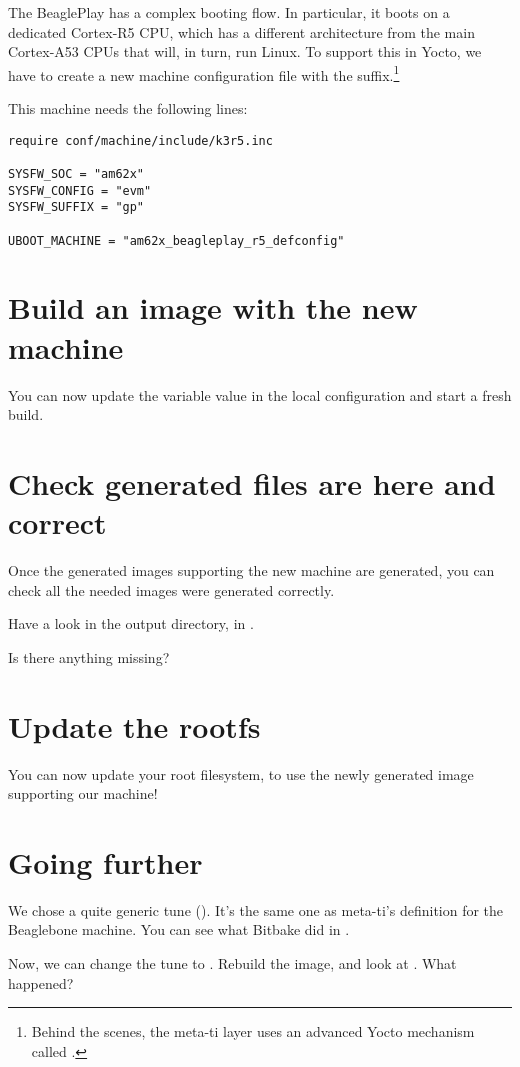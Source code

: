 The BeaglePlay has a complex booting flow. In particular, it boots on a dedicated Cortex-R5 CPU,
 which has a different architecture from the main Cortex-A53 CPUs that will, in turn, run Linux.
 To support this in Yocto, we have to create a new machine configuration file with the 
suffix.\footnote{Behind the scenes, the meta-ti layer uses an advanced Yocto mechanism called .}

This  machine needs the following lines:
\begin{verbatim}
require conf/machine/include/k3r5.inc

SYSFW_SOC = "am62x"
SYSFW_CONFIG = "evm"
SYSFW_SUFFIX = "gp"

UBOOT_MACHINE = "am62x_beagleplay_r5_defconfig"
\end{verbatim}
\fi

\section{Build an image with the new machine}

You can now update the  variable value in the local configuration
and start a fresh build.

\section{Check generated files are here and correct}

Once the generated images supporting the new  machine are
generated, you can check all the needed images were generated
correctly.

Have a look in the output directory, in .

\if{}
Is there anything missing?
\fi

\section{Update the rootfs}

You can now update your root filesystem, to use the newly
generated image supporting our  machine!

\if{}
\section{Going further}

We chose a quite generic tune (). It's the same
one as meta-ti's definition for the Beaglebone machine. You can see
what Bitbake did in .

Now, we can change the tune to . Rebuild the
image, and look at . What happened?
\fi
